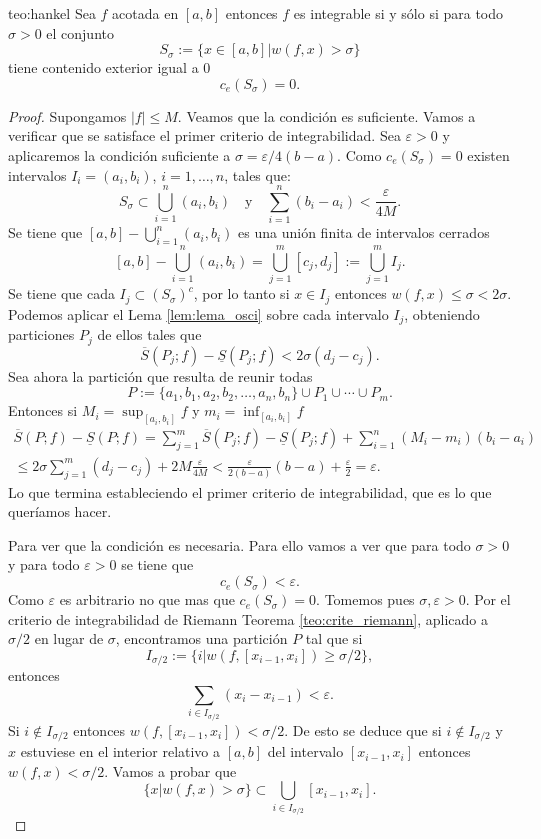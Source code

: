  
 \begin{teorema}{teo:hankel}  Sea $f$ acotada en $[a,b]$ entonces $f$ es integrable si y sólo si para todo $\sigma>0$ el conjunto 
 $$S_{\sigma}:=\{x\in [a,b]| w(f,x)>\sigma\}$$ 
 tiene contenido exterior igual a $0$ 
 $$c_e(S_{\sigma})=0.$$
   \end{teorema}
\begin{proof}  Supongamos $|f|\leq M$. Veamos que la condición es suficiente. Vamos a verificar que se satisface el primer criterio de integrabilidad. Sea $\varepsilon>0$ y aplicaremos la condición suficiente a $\sigma=\varepsilon/4(b-a)$. Como $c_e(S_\sigma)=0$ existen intervalos $I_i=(a_i,b_i)$, $i=1,\ldots,n$, tales que:
$$S_\sigma\subset \bigcup_{i=1}^n(a_i,b_i)\quad\text{y}\quad \sum_{i=1}^n(b_i-a_i)<\frac{\varepsilon}{4M}.$$ 
 Se tiene que $[a,b]-\bigcup_{i=1}^n(a_i,b_i)$ es una unión finita de intervalos cerrados
 \[
  [a,b]-\bigcup_{i=1}^n(a_i,b_i)= \bigcup_{j=1}^m [c_j,d_j]:= \bigcup_{j=1}^m I_j.
 \]
Se tiene que cada $I_j\subset \left(S_\sigma\right)^c$, por lo tanto si $x\in I_j$ entonces $w(f,x)\leq \sigma<2\sigma$. Podemos aplicar el Lema \ref{lem:lema_osci} sobre cada intervalo $I_j$, obteniendo particiones $P_j$ de ellos tales que
 \[ \overline{S}(P_j;f)-\underline{S}(P_j;f)<2\sigma(d_j-c_j).\]
 Sea ahora la partición que resulta de reunir todas 
 \[
  P:=\{a_1,b_1,a_2,b_2,\ldots,a_n,b_n\}\cup P_1\cup\cdots\cup P_m.
 \]
Entonces si $M_i=\sup_{[a_i,b_i]}f$ y $m_i=\inf_{[a_i,b_i]}f$
\begin{multline*}
  \overline{S}(P;f)-\underline{S}(P;f)=\sum_{j=1}^m \overline{S}(P_j;f)-\underline{S}(P_j;f)+\sum_{i=1}^n(M_i-m_i)(b_i-a_i)\\
  \leq 2\sigma\sum_{j=1}^m(d_j-c_j)+2M\frac{\varepsilon}{4M}<\frac{\varepsilon}{2(b-a)}(b-a)+\frac{\varepsilon}{2}=\varepsilon.
\end{multline*}
Lo que termina estableciendo el primer criterio de integrabilidad, que es lo que queríamos hacer.

Para ver que la condición es necesaria. Para ello vamos a ver que para todo $\sigma>0$ y para todo $\varepsilon>0$ se tiene que 
\begin{equation}\label{eq:hankel_final}
 c_e(S_\sigma)<\varepsilon.
\end{equation}
Como $\varepsilon$ es arbitrario no que mas que $c_e(S_\sigma)=0$. Tomemos pues $\sigma,\varepsilon>0$. Por el criterio de integrabilidad de Riemann Teorema \ref{teo:crite_riemann}, aplicado a $\sigma/2$ en lugar de $\sigma$, encontramos una partición $P$ tal que si 
\[
 I_{\sigma/2}:=\{i|w(f,[x_{i-1},x_i])\geq\sigma/2\},
\] 
entonces
\[
 \sum_{i\in I_{\sigma/2}}(x_i-x_{i-1})<\varepsilon.
\]
Si $i\notin I_{\sigma/2}$ entonces $w(f,[x_{i-1},x_i])<\sigma/2$. De esto se deduce que  si $i\notin I_{\sigma/2}$ y $x$ estuviese en el interior relativo a $[a,b]$ del intervalo $[x_{i-1},x_i]$ entonces $w(f,x)<\sigma/2$. Vamos a probar que
\begin{equation}\label{eq:hankel_conj=}
 \{x| w(f,x)>\sigma\}\subset \bigcup_{i\in I_{\sigma/2}}[x_{i-1},x_i].
\end{equation}


\end{proof}

